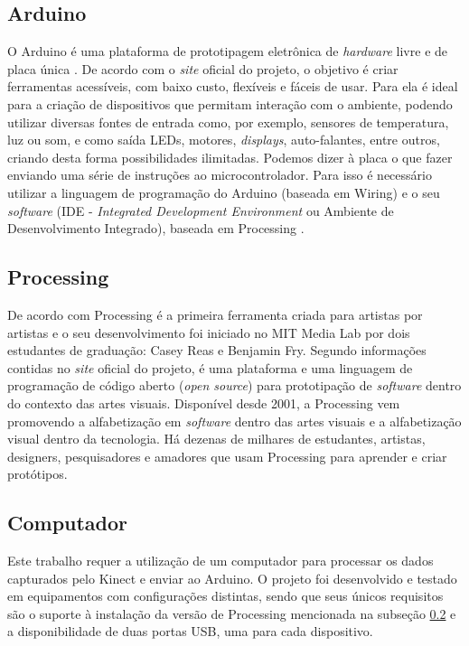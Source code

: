 \subsection{Arduino}

O Arduino é uma plataforma de prototipagem eletrônica de \textit{hardware} livre e de placa única \cite{arduino}. De acordo com o \textit{site} oficial do projeto, o objetivo é criar ferramentas acessíveis, com baixo custo, flexíveis e fáceis de usar. Para  ela é ideal para a criação de dispositivos que permitam interação com o ambiente, podendo utilizar diversas fontes de entrada como, por exemplo, sensores de temperatura, luz ou som, e como saída LEDs, motores, \textit{displays}, auto-falantes, entre outros, criando desta forma possibilidades ilimitadas. Podemos dizer à placa o que fazer enviando uma série de instruções ao microcontrolador. Para isso é necessário utilizar a linguagem de programação do Arduino (baseada em Wiring) e o seu \textit{software} (IDE - \textit{Integrated Development Environment} ou Ambiente de Desenvolvimento Integrado), baseada em Processing \cite{arduino}. 


\subsection{Processing}
\label{sec:processing}

De acordo com  Processing é a primeira ferramenta criada para artistas por artistas e o seu desenvolvimento foi iniciado no MIT Media Lab por dois estudantes de graduação: Casey Reas e Benjamin Fry. Segundo informações contidas no \textit{site} oficial do projeto,  é uma plataforma e uma linguagem de programação de código aberto (\textit{open source}) para prototipação de \textit{software} dentro do contexto das artes visuais. Disponível desde 2001, a Processing vem promovendo a alfabetização em \textit{software} dentro das artes visuais e a alfabetização visual dentro da tecnologia. Há dezenas de milhares de estudantes, artistas, designers, pesquisadores e amadores que usam Processing para aprender e criar protótipos.

\subsection{Computador}
\label{sec:computador}

Este trabalho requer a utilização de um computador para processar os dados capturados pelo Kinect e enviar ao Arduino. O projeto foi desenvolvido e testado em equipamentos com configurações distintas, sendo que seus únicos requisitos são o suporte à instalação da versão de Processing mencionada na subseção \ref{sec:processing}  e a disponibilidade de duas portas USB, uma para cada dispositivo.



